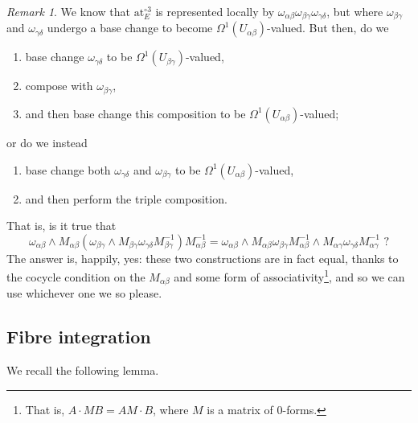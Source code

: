 \documentclass[11pt,fleqn]{article}
\theoremstyle{plain}
\theoremstyle{definition}
\theoremstyle{remark}
\newtheorem{remark}[theorem]{Remark}
\numberwithin{equation}{theorem}
\newcommand{\at}{\mathrm{at}}
\newcommand{\expat}[1]{\at^{\circ#1}}
\begin{document}
        \begin{remark}\label{remark:order-of-base-change-and-composition}
            We know that $\expat{3}_E$ is represented locally by $\omega_{\alpha\beta}\omega_{\beta\gamma}\omega_{\gamma\delta}$, but where $\omega_{\beta\gamma}$ and $\omega_{\gamma\delta}$ undergo a base change to become $\Omega^1(U_{\alpha\beta})$-valued.
            But then, do we
            \begin{enumerate}[1.]
                \item base change $\omega_{\gamma\delta}$ to be $\Omega^1(U_{\beta\gamma})$-valued,
                \item compose with $\omega_{\beta\gamma}$,
                \item and then base change this composition to be $\Omega^1(U_{\alpha\beta})$-valued;
            \end{enumerate}
            or do we instead
            \begin{enumerate}[1.]
                \item base change both $\omega_{\gamma\delta}$ and $\omega_{\beta\gamma}$ to be $\Omega^1(U_{\alpha\beta})$-valued,
                \item and then perform the triple composition.
            \end{enumerate}
            That is, is it true that
            \[
                \omega_{\alpha\beta} \wedge M_{\alpha\beta}(\omega_{\beta\gamma} \wedge M_{\beta\gamma}\omega_{\gamma\delta}M_{\beta\gamma}^{-1})M_{\alpha\beta}^{-1}
                =
                \omega_{\alpha\beta} \wedge M_{\alpha\beta}\omega_{\beta\gamma}M_{\alpha\beta}^{-1} \wedge M_{\alpha\gamma}\omega_{\gamma\delta}M_{\alpha\gamma}^{-1}
                \,\,?
            \]
            The answer is, happily, yes: these two constructions are in fact equal, thanks to the cocycle condition on the $M_{\alpha\beta}$ and some form of associativity\footnote{That is, $A\cdot MB = AM\cdot B$, where $M$ is a matrix of $0$-forms.}, and so we can use whichever one we so please.
        \end{remark}


    \subsection{Fibre integration}

        We recall the following lemma.
\end{document}
